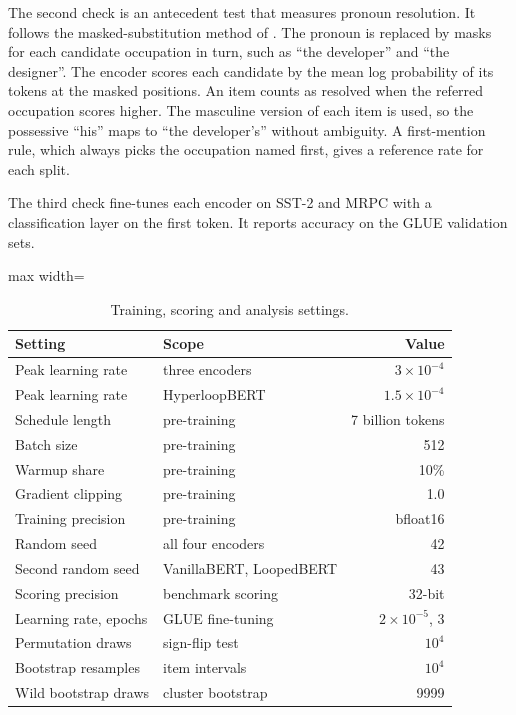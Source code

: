 \documentclass[sigconf,natbib=true]{acmart}
\begin{document}
The second check is an antecedent test that measures pronoun resolution. It
follows the masked-substitution method of \citet{kocijan2019surprisingly}. The
pronoun is replaced by masks for each candidate occupation in turn, such as
``the developer'' and ``the designer''. The encoder scores each candidate by the
mean log probability of its tokens at the masked positions. An item counts as
resolved when the referred occupation scores higher. The masculine version of
each item is used, so the possessive ``his'' maps to ``the developer's''
without ambiguity. A first-mention rule, which always picks the occupation named
first, gives a reference rate for each split.

The third check fine-tunes each encoder on SST-2 and MRPC with a classification
layer on the first token. It reports accuracy on the GLUE validation sets.


\begin{table}[!htb]
\centering
\caption{Training, scoring and analysis settings.}
\label{tab:reprosettings}
\footnotesize
\begin{adjustbox}{max width=\columnwidth}
\begin{tabular}{llr}
\toprule
Setting & Scope & Value \\
\midrule
Peak learning rate & three encoders & $3 \times 10^{-4}$ \\
Peak learning rate & HyperloopBERT & $1.5 \times 10^{-4}$ \\
Schedule length & pre-training & 7 billion tokens \\
Batch size & pre-training & 512 \\
Warmup share & pre-training & 10\% \\
Gradient clipping & pre-training & 1.0 \\
Training precision & pre-training & bfloat16 \\
Random seed & all four encoders & 42 \\
Second random seed & VanillaBERT, LoopedBERT & 43 \\
Scoring precision & benchmark scoring & 32-bit \\
Learning rate, epochs & GLUE fine-tuning & $2 \times 10^{-5}$, 3 \\
Permutation draws & sign-flip test & $10^4$ \\
Bootstrap resamples & item intervals & $10^4$ \\
Wild bootstrap draws & cluster bootstrap & 9999 \\
\bottomrule
\end{tabular}
\end{adjustbox}
\end{table}
\end{document}
